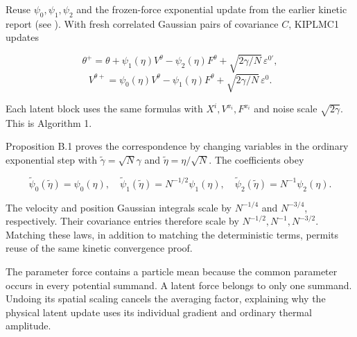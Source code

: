 \documentclass[11pt,a4paper]{article}
\begin{document}
Reuse \(\psi_0,\psi_1,\psi_2\) and the frozen-force exponential update from the earlier kinetic report (see \cite[Section~3.12.2]{LangevinLean2026Kinetic}). With fresh
correlated Gaussian pairs of covariance \(C\), KIPLMC1 updates


\[\theta^+=\theta+\psi_1(\eta)V^\theta-\psi_2(\eta)F^\theta
+\sqrt{2\gamma/N}\,\varepsilon^{0\prime},\]
\[V^{\theta+}=\psi_0(\eta)V^\theta-\psi_1(\eta)F^\theta
+\sqrt{2\gamma/N}\,\varepsilon^0.\]


Each latent block uses the same formulas with \(X^i,V^{x_i},F^{x_i}\)
and noise scale \(\sqrt{2\gamma}\). This is Algorithm 1.




Proposition B.1 proves the correspondence by changing variables in the
ordinary exponential step with \(\widetilde\gamma=\sqrt N\gamma\) and
\(\widetilde\eta=\eta/\sqrt N\). The coefficients obey


\[\widetilde\psi_0(\widetilde\eta)=\psi_0(\eta),\quad
\widetilde\psi_1(\widetilde\eta)=N^{-1/2}\psi_1(\eta),\quad
\widetilde\psi_2(\widetilde\eta)=N^{-1}\psi_2(\eta).\]


The velocity and position Gaussian integrals scale by \(N^{-1/4}\) and
\(N^{-3/4}\), respectively. Their covariance entries therefore scale by
\(N^{-1/2},N^{-1},N^{-3/2}\). Matching these laws, in addition to matching
the deterministic terms, permits reuse of the same kinetic convergence proof.



The parameter force contains a particle mean because the common parameter occurs in every potential summand. A latent force belongs to only one summand. Undoing its spatial scaling cancels the averaging factor, explaining why the physical latent update uses its individual gradient and ordinary thermal amplitude.
\end{document}
